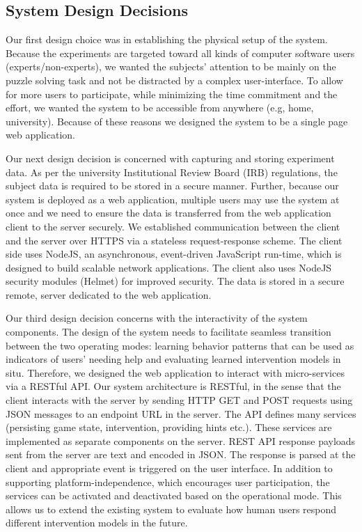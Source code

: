 \subsection{System Design Decisions}
Our first design choice was in establishing the physical setup of the system. 
Because the experiments are targeted toward all kinds of computer software users (experts/non-experts), we wanted the subjects' attention to be mainly on the puzzle solving task and not be distracted by a complex user-interface. 
To allow for more users to participate, while minimizing the time commitment and the effort, we wanted the system to be accessible from anywhere (e.g, home, university). 
Because of these reasons we designed the system to be a single page web application.

Our next design decision is concerned with capturing and storing experiment data. 
As per the university Institutional Review Board (IRB) regulations, the subject data is required to be stored in a secure manner. 
Further, because our system is deployed as a web application, multiple users may use the system at once and we need to ensure the data is transferred from the web application client to the server securely. 
We established communication between the client and the server over HTTPS via a stateless request-response scheme. 
The client side uses NodeJS, an asynchronous, event-driven JavaScript run-time, which is designed to build scalable network applications.  
The client also uses NodeJS security modules (Helmet) for improved security. 
The data is stored in a secure remote, server dedicated to the web application. 

Our third design decision concerns with the interactivity of the system components.
The design of the system needs to facilitate seamless transition between the two operating modes: learning behavior patterns that can be used as indicators of users' needing help and evaluating learned intervention models in situ. 
Therefore,  we designed the web application to interact with micro-services via a RESTful API. 
Our system architecture is RESTful, in the sense that the client interacts with the server by sending HTTP GET and POST requests using JSON messages to an endpoint URL in the server. 
The API defines many services (persisting game state, intervention, providing hints etc.). 
These services are implemented as separate components on the server. 
REST API response payloads sent from the server are text and encoded in JSON. The response is parsed at the client and appropriate event is triggered on the user interface. 
In addition to supporting platform-independence, which encourages user participation, the services can be activated and deactivated based on the operational mode. 
This allows us to extend the existing system to evaluate how human users respond different intervention models in the future.


